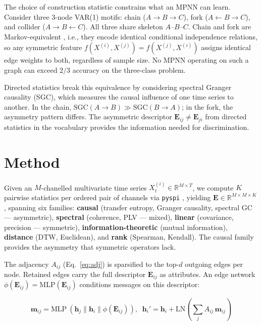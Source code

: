 \documentclass{article}
\theoremstyle{plain}
\begin{document}
The choice of construction statistic constrains what an MPNN can learn. Consider three 3-node VAR(1) motifs: chain ($A \to B \to C$), fork ($A \leftarrow B \to C$), and collider ($A \to B \leftarrow C$). All three share skeleton $A$--$B$--$C$. Chain and fork are Markov-equivalent \citep{verma1990}, i.e., they encode identical conditional independence relations, so any symmetric feature $f(X^{(i)}, X^{(j)}) = f(X^{(j)}, X^{(i)})$ assigns identical edge weights to both, regardless of sample size. No MPNN operating on such a graph can exceed $2/3$ accuracy on the three-class problem.

Directed statistics break this equivalence by considering spectral Granger causality (SGC), which measures the causal influence of one time series to another. In the chain, $\mathrm{SGC}(A \to B) \gg \mathrm{SGC}(B \to A)$; in the fork, the asymmetry pattern differs. The asymmetric descriptor $\mathbf{E}_{ij} \neq \mathbf{E}_{ji}$ from directed statistics in the vocabulary provides the information needed for discrimination.

\section{Method}
\label{sec:method}

Given an $M$-chanelled multivariate time series $X_t^{(i)} \in \mathbb{R}^{M \times T}$, we compute $K$ pairwise statistics per ordered pair of channels via \texttt{pyspi} \citep{cliff2023}, yielding $\mathbf{E} \in \mathbb{R}^{M \times M \times K}$, spanning six families: \textbf{causal} (transfer entropy, Granger causality, spectral GC --- asymmetric), \textbf{spectral} (coherence, PLV --- mixed), \textbf{linear} (covariance, precision --- symmetric), \textbf{information-theoretic} (mutual information), \textbf{distance} (DTW, Euclidean), and \textbf{rank} (Spearman, Kendall). The causal family provides the asymmetry that symmetric operators lack.

The adjacency $A_{ij}$ (Eq.~\ref{eq:adj}) is sparsified to the top-$d$ outgoing edges per node. Retained edges carry the full descriptor $\mathbf{E}_{ij}$ as attributes. An edge network $\phi(\mathbf{E}_{ij}) = \mathrm{MLP}(\mathbf{E}_{ij})$ conditions messages on this descriptor:

\begin{footnotesize}
\begin{equation}
\mathbf{m}_{ij} = \mathrm{MLP}\ \left(\mathbf{h}_j \| \mathbf{h}_i \| \phi(\mathbf{E}_{ij})\right), \;\; \mathbf{h}_i' = \mathbf{h}_i + \mathrm{LN}\!\left(\textstyle\sum_j A_{ij}\,\mathbf{m}_{ij}\right)
\end{equation}
\end{footnotesize}
\end{document}
